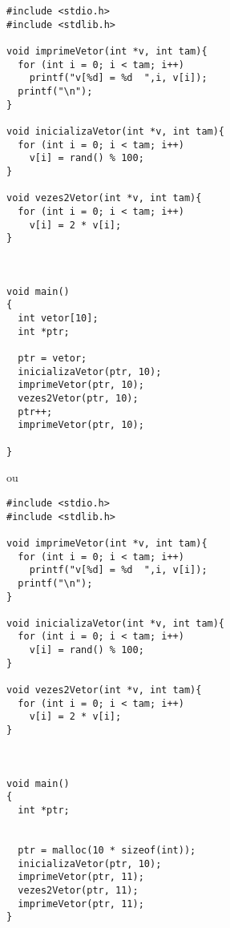\documentclass[a4paper]{article}
\begin{document}
\begin{verbatim}
#include <stdio.h>
#include <stdlib.h>

void imprimeVetor(int *v, int tam){
  for (int i = 0; i < tam; i++)
    printf("v[%d] = %d  ",i, v[i]);
  printf("\n");
}

void inicializaVetor(int *v, int tam){
  for (int i = 0; i < tam; i++)
    v[i] = rand() % 100;
}

void vezes2Vetor(int *v, int tam){
  for (int i = 0; i < tam; i++)
    v[i] = 2 * v[i];
}



void main()
{
  int vetor[10];
  int *ptr;

  ptr = vetor;
  inicializaVetor(ptr, 10);
  imprimeVetor(ptr, 10);
  vezes2Vetor(ptr, 10);
  ptr++;
  imprimeVetor(ptr, 10);

}
\end{verbatim}
ou
\begin{verbatim}
#include <stdio.h>
#include <stdlib.h>

void imprimeVetor(int *v, int tam){
  for (int i = 0; i < tam; i++)
    printf("v[%d] = %d  ",i, v[i]);
  printf("\n");
}

void inicializaVetor(int *v, int tam){
  for (int i = 0; i < tam; i++)
    v[i] = rand() % 100;
}

void vezes2Vetor(int *v, int tam){
  for (int i = 0; i < tam; i++)
    v[i] = 2 * v[i];
}



void main()
{
  int *ptr;


  ptr = malloc(10 * sizeof(int));
  inicializaVetor(ptr, 10);
  imprimeVetor(ptr, 11);
  vezes2Vetor(ptr, 11);
  imprimeVetor(ptr, 11);
}
\end{verbatim}
\end{document}
